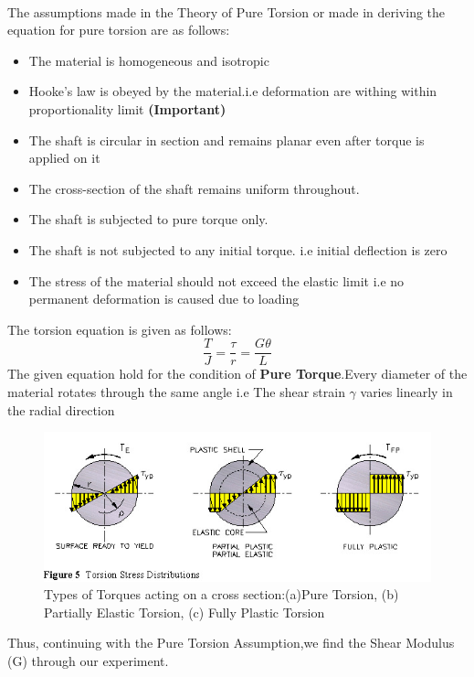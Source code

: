 \documentclass[12pt,a4paper]{article}	%
\begin{document}
\\
The assumptions made in the Theory of Pure Torsion or made in deriving the equation for pure torsion are as follows:
\thispagestyle{empty}	%
\begin{itemize}
\item The material is homogeneous and isotropic
\item Hooke's law is obeyed by the material.i.e deformation are withing within proportionality limit \textbf{(Important)}
\item The shaft is circular in section and remains planar even after torque is applied on it
\item The cross-section of the shaft remains uniform throughout.
\item The shaft is subjected to pure torque only.
\item The shaft is not subjected to any initial torque. i.e initial deflection is zero
\item The stress of the material should not exceed the elastic limit i.e no permanent deformation is caused due to loading
\end{itemize}

\pagebreak
The torsion equation is given as follows:
\[\frac{T}{J} = \frac{\tau}{r} = \frac{G \theta}{L}\]
The given equation hold for the condition of \textbf{Pure Torque}.Every diameter of the material rotates through the same angle i.e The shear strain $\gamma$ varies linearly in the radial direction
\bigbreak
\thispagestyle{empty}	%
\begin{figure}[h!]
	\centering
	\includegraphics[width=\linewidth]{Pure_Torque.jpg}
	\caption{Types of Torques acting on a cross section:(a)Pure Torsion, (b) Partially Elastic Torsion, (c) Fully Plastic Torsion}
\end{figure}
\bigbreak
Thus, continuing with the Pure Torsion Assumption,we find the Shear Modulus (G) through our experiment.
\end{document}
